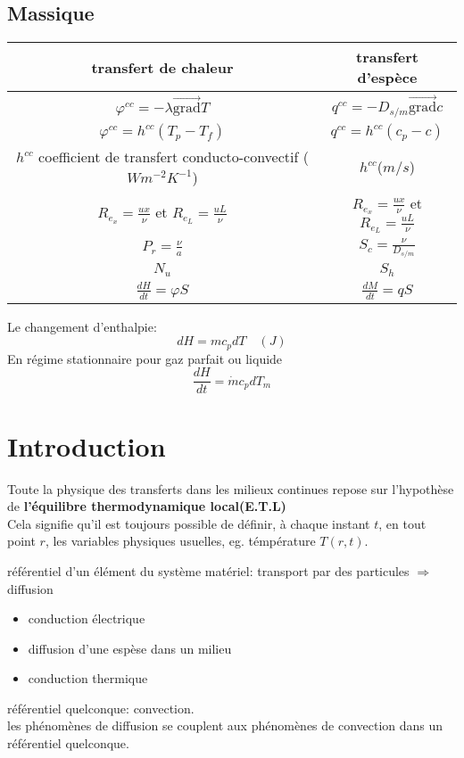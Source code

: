 \documentclass{article}
\begin{document}
\subsection{Massique}
\begin{tabular}{|c|c|}
\hline
transfert de chaleur & transfert d'esp\`ece \\
\hline
$\varphi^{cc}= - \lambda \vec{\mbox{grad}}T$ & $q^{cc}= - D_{s/m} \vec{\mbox{grad}}c $\\
\hline
$\varphi^{cc}=h^{cc}(T_p - T_f)$ & $q^{cc}=h^{cc}(c_p - c)$\\
\hline
$h^{cc}$ coefficient de transfert conducto-convectif ($Wm^{-2}K^{-1}$) & $h^{cc} $($m/s$) \\
\hline
$R_{e_x}=\frac{ux}{\nu}$ et $R_{e_L}=\frac{ uL}{\nu}$ & $R_{e_x}=\frac{ux}{\nu}$ et $R_{e_L}=\frac{ uL}{\nu}$ \\
\hline
$P_r=\frac{ \nu}{a} $& $S_c=\frac{\nu}{D_{s/m}} $\\
\hline
$N_u$ & $S_h $\\
\hline
$\frac{ dH}{dt}=\varphi S$ & $\frac{dM}{dt}=qS$\\
\hline
\end{tabular}

Le changement d'enthalpie: $$dH=m c_p dT \quad (J)$$
En r\'egime stationnaire pour gaz parfait ou liquide
$$\frac{ dH}{dt}=\dot{m}c_p dT_m$$

\section{Introduction}
Toute la physique des transferts dans les milieux continues repose sur l'hypoth\`ese de \textbf{l'\'equilibre thermodynamique local(E.T.L)}\\
Cela signifie qu'il est toujours possible de d\'efinir, \`a chaque instant $t$, en tout point $r$, les variables physiques usuelles, eg. t\'emp\'erature $T(r,t)$.

\bigskip
r\'ef\'erentiel d'un \'el\'ement du syst\`eme mat\'eriel: transport par des particules $\Rightarrow$ diffusion
\begin{itemize}
\item conduction \'electrique
\item diffusion d'une esp\`ese dans un milieu
\item conduction thermique
\end{itemize}

r\'ef\'erentiel quelconque: convection.\\
les ph\'enom\`enes de diffusion se couplent aux ph\'enom\`enes de convection dans un r\'ef\'erentiel quelconque.
\end{document}
